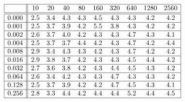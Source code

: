 \[
\begin{array}{|c||ccccccccc|}
\hline 
& 10 & 20 & 40 & 80 & 160 & 320 & 640 & 1280 & 2560\\
\hline \hline 
0.000 & 2.5 & 3.4 & 4.3 & 4.3 & 4.5 & 4.3 & 4.3 & 4.2 & 4.2 \\ \hline 
0.001 & 2.5 & 3.7 & 3.9 & 4.2 & 5.5 & 3.8 & 4.3 & 4.2 & 4.2 \\ \hline 
0.002 & 2.6 & 3.7 & 4.0 & 4.2 & 4.3 & 4.3 & 4.7 & 4.3 & 4.1 \\ \hline 
0.004 & 2.5 & 3.7 & 3.7 & 4.4 & 4.2 & 4.3 & 4.7 & 4.2 & 4.4 \\ \hline 
0.008 & 2.9 & 3.4 & 4.3 & 4.3 & 4.2 & 4.3 & 4.7 & 4.2 & 4.2 \\ \hline 
0.016 & 2.9 & 3.8 & 3.7 & 4.2 & 4.3 & 4.3 & 4.5 & 4.4 & 4.2 \\ \hline 
0.032 & 2.7 & 3.6 & 3.8 & 4.2 & 4.3 & 4.4 & 4.5 & 4.3 & 4.2 \\ \hline 
0.064 & 2.6 & 3.4 & 4.2 & 4.3 & 4.3 & 4.7 & 4.3 & 4.3 & 4.2 \\ \hline 
0.128 & 2.5 & 3.7 & 3.9 & 4.2 & 4.2 & 4.7 & 4.5 & 4.3 & 4.1 \\ \hline 
0.256 & 2.8 & 3.3 & 4.4 & 4.2 & 4.4 & 4.4 & 5.2 & 4.4 & 4.5 \\ \hline 
\end{array}
\]

